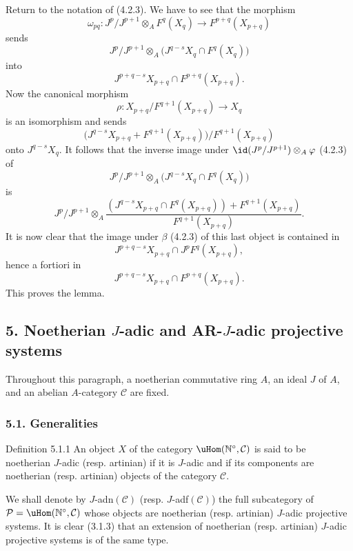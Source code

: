 \begin{prooftext}[Proof of 4.2.7]
Return to the notation of (4.2.3). We have to see that the morphism
\[
\omega_{pq}:J^p/J^{p+1}\otimes_A F^q(X_q)\longrightarrow F^{p+q}(X_{p+q})
\]
sends
\[
J^p/J^{p+1}\otimes_A
\bigl(J^{q-s}X_q\cap F^q(X_q)\bigr)
\]
into
\[
J^{p+q-s}X_{p+q}\cap F^{p+q}(X_{p+q}).
\]
Now the canonical morphism
\[
\rho:X_{p+q}/F^{q+1}(X_{p+q})\longrightarrow X_q
\]
is an isomorphism and sends
\[
\bigl(J^{q-s}X_{p+q}+F^{q+1}(X_{p+q})\bigr)/F^{q+1}(X_{p+q})
\]
onto \(J^{q-s}X_q\). It follows that the inverse image under
\(\id(J^p/J^{p+1})\otimes_A\varphi\) (4.2.3) of
\[
J^p/J^{p+1}\otimes_A
\bigl(J^{q-s}X_q\cap F^q(X_q)\bigr)
\]
is
\[
J^p/J^{p+1}\otimes_A
\frac{(J^{q-s}X_{p+q}\cap F^q(X_{p+q}))+F^{q+1}(X_{p+q})}
     {F^{q+1}(X_{p+q})}.
\]
It is now clear that the image under \(\beta\) (4.2.3) of this last object is contained in
\[
J^{p+q-s}X_{p+q}\cap J^pF^q(X_{p+q}),
\]
hence a fortiori in
\[
J^{p+q-s}X_{p+q}\cap F^{p+q}(X_{p+q}).
\]
This proves the lemma.
\end{prooftext}

\subsection*{5. Noetherian \(J\)-adic and AR-\(J\)-adic projective systems}

Throughout this paragraph, a noetherian commutative ring \(A\), an ideal \(J\) of \(A\), and an abelian \(A\)-category \(\mathcal C\) are fixed.

\subsubsection*{5.1. Generalities}

\begin{statement}{Definition 5.1.1}
An object \(X\) of the category \(\uHom(\mathbb N^\circ,\mathcal C)\) is said to be noetherian \(J\)-adic (resp. artinian) if it is \(J\)-adic and if its components are noetherian (resp. artinian) objects of the category \(\mathcal C\).
\end{statement}

We shall denote by \(J\)-adn\((\mathcal C)\) (resp. \(J\)-adf\((\mathcal C)\)) the full subcategory of
\(\mathcal P=\uHom(\mathbb N^\circ,\mathcal C)\) whose objects are noetherian (resp. artinian) \(J\)-adic projective systems. It is clear (3.1.3) that an extension of noetherian (resp. artinian) \(J\)-adic projective systems is of the same type.

